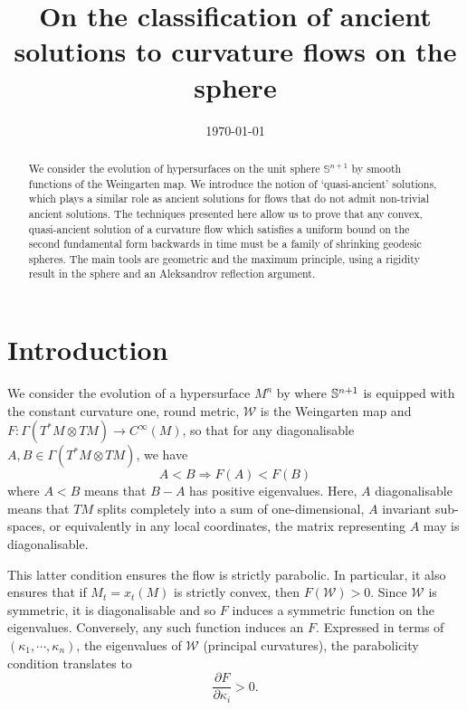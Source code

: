 \documentclass{amsart}
\begin{document}
\title[Ancient solutions to curvature flows in the sphere]
 {On the classification of ancient solutions to curvature flows on the sphere}

\curraddr{}
\email{}
\date{\today}

\dedicatory{}
\subjclass[2010]{}
\keywords{}

\begin{abstract}
We consider the evolution of hypersurfaces on the unit sphere $\mathbb{S}^{n+1}$ by smooth functions of the Weingarten map. We introduce the notion of `quasi-ancient' solutions, which plays a similar role as ancient solutions for flows that do not admit non-trivial ancient solutions. The techniques presented here allow us to prove that any convex, quasi-ancient solution of a curvature flow which satisfies a uniform bound on the second fundamental form backwards in time must be a family of shrinking geodesic spheres. The main tools are geometric and the maximum principle, using a rigidity result in the sphere and an Aleksandrov reflection argument.
\end{abstract}

\maketitle

\section{Introduction}
\label{sec:intro}

We consider the evolution of a hypersurface $M^n$ by
\eq{\label{eq:CurvFlow}
\partial_tx=-F(\mathcal{W})\nu,~ x:M^n\times[0,T)\to \S^{n+1},
}
where \(\S^{n+1}\) is equipped with the constant curvature one, round metric, \(\mathcal{W}\) is the Weingarten map and \(F : \Gamma(T^\ast M \otimes TM) \to C^{\infty}(M)\), so that for any diagonalisable \(A, B \in \Gamma(T^\ast M \otimes TM)\), we have
\[
A < B \Rightarrow F(A) < F(B)
\]
where \(A < B\) means that \(B - A\) has positive eigenvalues. Here, \(A\) diagonalisable means that \(TM\) splits completely into a sum of one-dimensional, \(A\) invariant sub-spaces, or equivalently in any local coordinates, the matrix representing \(A\) may is diagonalisable.

This latter condition ensures the flow is strictly parabolic. In particular, it also ensures that if \(M_t = x_t(M)\) is strictly convex, then \(F(\mathcal{W}) > 0.\) Since \(\mathcal{W}\) is symmetric, it is diagonalisable and so \(F\) induces a symmetric function on the eigenvalues. Conversely, any such function induces an \(F\). Expressed in terms of \((\kappa_1,\cdots,\kappa_n)\), the eigenvalues of \(\mathcal{W}\) (principal curvatures), the parabolicity condition translates to 
\[
\frac{\partial F}{\partial \kappa_i} > 0.
\]
\end{document}
